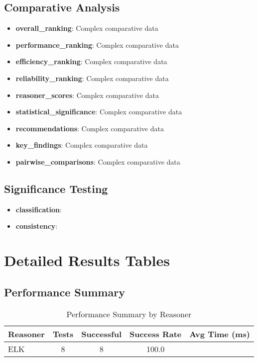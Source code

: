 \documentclass[11pt,a4paper]{{article}}
\begin{document}
\subsection{Comparative Analysis}
\begin{itemize}
    \item \textbf{overall_ranking}: Complex comparative data
    \item \textbf{performance_ranking}: Complex comparative data
    \item \textbf{efficiency_ranking}: Complex comparative data
    \item \textbf{reliability_ranking}: Complex comparative data
    \item \textbf{reasoner_scores}: Complex comparative data
    \item \textbf{statistical_significance}: Complex comparative data
    \item \textbf{recommendations}: Complex comparative data
    \item \textbf{key_findings}: Complex comparative data
    \item \textbf{pairwise_comparisons}: Complex comparative data
\end{itemize}


\subsection{Significance Testing}
\begin{itemize}
    \item \textbf{classification}:
    \item \textbf{consistency}:
\end{itemize}



\section{Detailed Results Tables}

\subsection{Performance Summary}
\begin{table}[h]
\centering
\caption{Performance Summary by Reasoner}
\begin{tabular}{lcccc}
\hline
\textbf{Reasoner} & \textbf{Tests} & \textbf{Successful} & \textbf{Success Rate} & \textbf{Avg Time (ms)} \\
\hline
ELK & 8 & 8 & 100.0%
\hline
\end{tabular}
\end{table}
\end{document}
